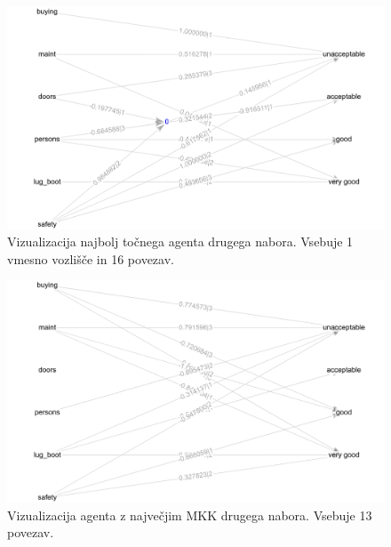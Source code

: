 \begin{figure}[H]
    \begin{center}
        \includegraphics[width=13cm]{car/2/acc_g}
    \end{center}
    \caption{Vizualizacija najbolj točnega agenta drugega nabora. Vsebuje 1 vmesno vozlišče in 16 povezav.}
    \label{fig:car_acc_2_g}
\end{figure}

\begin{figure}[H]
    \begin{center}
        \includegraphics[width=13cm]{car/2/mcc_g}
    \end{center}
    \caption{Vizualizacija agenta z največjim MKK drugega nabora. Vsebuje 13 povezav.}
    \label{fig:car_mcc_2_g}
\end{figure}

\newpage

